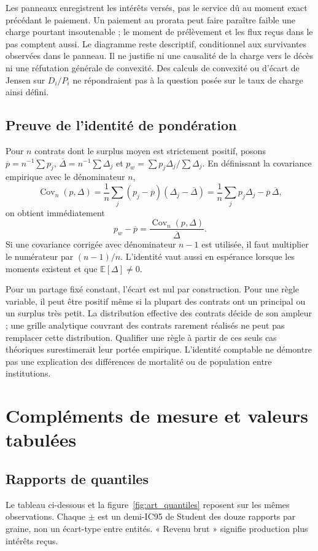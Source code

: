 Les panneaux enregistrent les intérêts versés, pas le service dû
au moment exact précédant le paiement. Un paiement au prorata peut
faire paraître faible une charge pourtant insoutenable ; le moment
de prélèvement et les flux reçus dans le pas comptent aussi.
Le diagramme reste descriptif, conditionnel aux survivantes observées
dans le panneau. Il ne justifie ni une causalité de la charge vers
le décès ni une réfutation générale de convexité. Des calculs de
convexité ou d'écart de Jensen sur $D_i/P_i$ ne répondraient pas
à la question posée sur le taux de charge ainsi défini.

\subsection{Preuve de l'identité de pondération}\label{sec:ponderation}
Pour $n$ contrats dont le surplus moyen est strictement positif,
posons $\overline p=n^{-1}\sum p_j$,
$\overline\Delta=n^{-1}\sum\Delta_j$ et
$p_w=\sum p_j\Delta_j/\sum\Delta_j$.
En définissant la covariance empirique avec le dénominateur $n$,
\[
 \operatorname{Cov}_n(p,\Delta)
 =\frac1n\sum_j(p_j-\overline p)(\Delta_j-\overline\Delta)
 =\frac1n\sum_jp_j\Delta_j-\overline p\,\overline\Delta,
\]
on obtient immédiatement
\begin{equation}
 p_w-\overline p=\frac{\operatorname{Cov}_n(p,\Delta)}{\overline\Delta}.
 \label{eq:identite}
\end{equation}
Si une covariance corrigée avec dénominateur $n-1$ est utilisée,
il faut multiplier le numérateur par $(n-1)/n$. L'identité vaut
aussi en espérance lorsque les moments existent et que
$\mathbb E[\Delta]\ne0$.

Pour un partage fixé constant, l'écart est nul par construction.
Pour une règle variable, il peut être positif même si la plupart
des contrats ont un principal ou un surplus très petit. La
distribution effective des contrats décide de son ampleur ; une
grille analytique couvrant des contrats rarement réalisés ne peut
pas remplacer cette distribution. Qualifier une règle à partir
de ces seuls cas théoriques surestimerait leur portée empirique.
L'identité comptable ne démontre pas une explication des différences
de mortalité ou de population entre institutions.

\section{Compléments de mesure et valeurs tabulées}\label{sec:tableaux}
\subsection{Rapports de quantiles}
Le tableau ci-dessous et la figure~\ref{fig:art_quantiles} reposent
sur les mêmes observations. Chaque $\pm$ est un demi-IC95 de
Student des douze rapports par graine, non un écart-type entre
entités. « Revenu brut » signifie production plus intérêts reçus.
\onecolumn
\begin{small}\end{small}
\twocolumn


